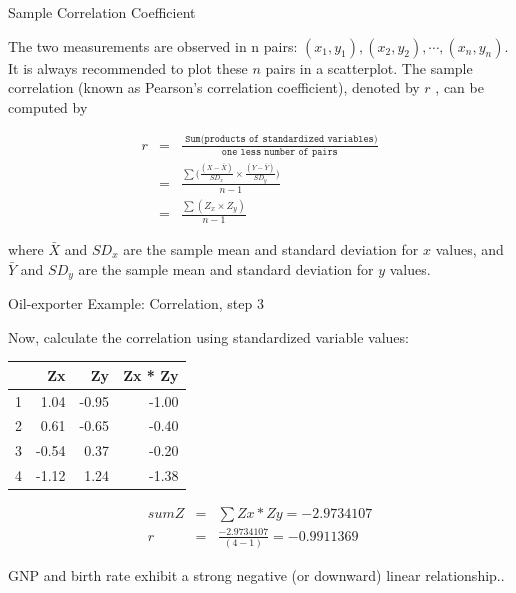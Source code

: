 \documentclass[14pt]{beamer}\usepackage[]{graphicx}\usepackage[]{color}
\begin{document}
\begin{frame}[fragile]{Sample Correlation Coefficient}

{\footnotesize{
The two measurements are observed in n pairs:
$(x_1, y_1), (x_2, y_2), \cdots , (x_n, y_n)$. It is always recommended to plot these $n$  pairs in a scatterplot. The sample correlation (known as Pearson's  correlation coefficient), denoted by $r$ , can be computed by
}}

{\scriptsize{
\begin{eqnarray*}
  r &=& \frac{ \texttt{ Sum(products of standardized variables)}}{\texttt{one less number of pairs}} \\
  &=& \frac{ \sum \Big(\frac{(X - \bar{X})}{SD_x} \times \frac{(Y - \bar{Y})}{SD_y} \Big) }{n - 1} \\
  &=& \frac{ \sum (Z_x \times Z_y)}{n - 1}
\end{eqnarray*}
}}

\vspace{-6mm}

{\footnotesize{
where $\bar{X}$ and $SD_x$ are the sample mean and standard deviation for $x$  values, and $\bar{Y}$ and $SD_y$ are the sample mean and standard deviation for $y$ values.
}}

\end{frame}

\begin{frame}[fragile]{Oil-exporter Example: Correlation, step 3}

{\small{
Now, calculate the correlation using standardized variable values:
}}

{\footnotesize{
\begin{table}[ht]
\centering
\begin{tabular}{rrrr}
  \hline
 & Zx & Zy & Zx * Zy \\ 
  \hline
1 & 1.04 & -0.95 & -1.00 \\ 
  2 & 0.61 & -0.65 & -0.40 \\ 
  3 & -0.54 & 0.37 & -0.20 \\ 
  4 & -1.12 & 1.24 & -1.38 \\ 
   \hline
\end{tabular}
\end{table}

}}

\vspace{-6mm}

{\footnotesize{
\begin{eqnarray*}
sumZ &=& \sum Zx * Zy = -2.9734107 \\
r    &=& \frac{ -2.9734107}{ (4 - 1)} = -0.9911369
\end{eqnarray*}
}}

{\small{
GNP and birth rate exhibit a strong negative (or downward) linear  relationship..
}}
\end{frame}
\end{document}
